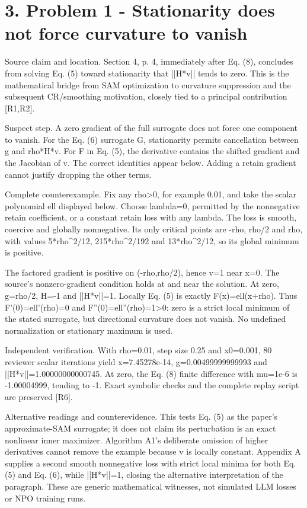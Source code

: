 \documentclass[10pt]{article}
\begin{document}
\section*{3. Problem 1 - Stationarity does not force curvature to vanish}
Source claim and location. Section 4, p. 4, immediately after Eq. (8), concludes from solving Eq. (5) toward stationarity that ||H*v|| tends to zero. This is the mathematical bridge from SAM optimization to curvature suppression and the subsequent CR/smoothing motivation, closely tied to a principal contribution [R1,R2].\par
Suspect step. A zero gradient of the full surrogate does not force one component to vanish. For the Eq. (6) surrogate G, stationarity permits cancellation between g and rho*H*v. For F in Eq. (5), the derivative contains the shifted gradient and the Jacobian of v. The correct identities appear below. Adding a retain gradient cannot justify dropping the other terms.\par
Complete counterexample. Fix any rho>0, for example 0.01, and take the scalar polynomial ell displayed below. Choose lambda=0, permitted by the nonnegative retain coefficient, or a constant retain loss with any lambda. The loss is smooth, coercive and globally nonnegative. Its only critical points are -rho, rho/2 and rho, with values 5*rho\textasciicircum{}2/12, 215*rho\textasciicircum{}2/192 and 13*rho\textasciicircum{}2/12, so its global minimum is positive.\par
The factored gradient is positive on (-rho,rho/2), hence v=1 near x=0. The source’s nonzero-gradient condition holds at and near the solution. At zero, g=rho/2, H=-1 and ||H*v||=1. Locally Eq. (5) is exactly F(x)=ell(x+rho). Thus F’(0)=ell’(rho)=0 and F”(0)=ell”(rho)=1>0: zero is a strict local minimum of the stated surrogate, but directional curvature does not vanish. No undefined normalization or stationary maximum is used.\par
Independent verification. With rho=0.01, step size 0.25 and x0=0.001, 80 reviewer scalar iterations yield x=7.45278e-14, g=0.00499999999993 and ||H*v||=1.00000000000745. At zero, the Eq. (8) finite difference with mu=1e-6 is -1.00004999, tending to -1. Exact symbolic checks and the complete replay script are preserved [R6].\par
Alternative readings and counterevidence. This tests Eq. (5) as the paper’s approximate-SAM surrogate; it does not claim its perturbation is an exact nonlinear inner maximizer. Algorithm A1’s deliberate omission of higher derivatives cannot remove the example because v is locally constant. Appendix A supplies a second smooth nonnegative loss with strict local minima for both Eq. (5) and Eq. (6), while ||H*v||=1, closing the alternative interpretation of the paragraph. These are generic mathematical witnesses, not simulated LLM losses or NPO training runs.\par
\end{document}
